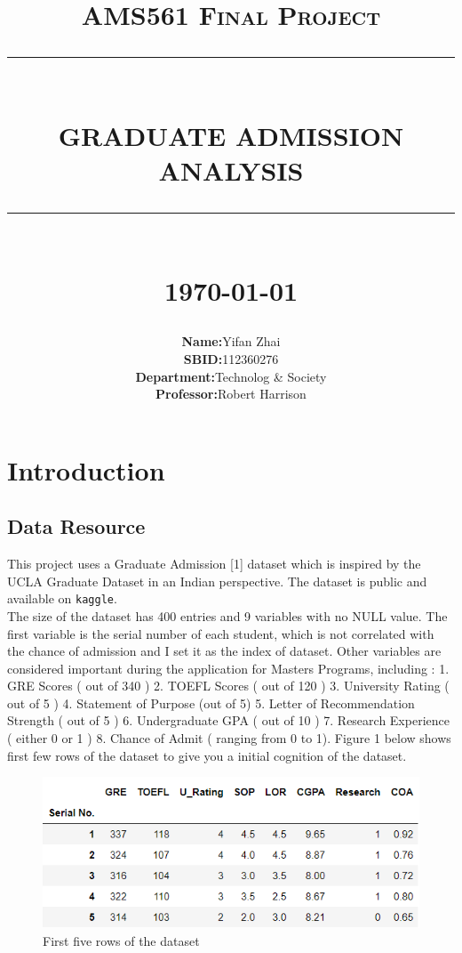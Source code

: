 \documentclass[12pt]{article}
\newcommand{\HRule}[1]{\rule{\linewidth}{#1}}
\begin{document}
\begin{sloppypar}
\title{ \LARGE \textsc{AMS561 Final Project}
		\\ [2.0cm]
		\HRule{0.5pt} \\
		\LARGE \textbf{\uppercase{Graduate Admission Analysis}}
		\HRule{2pt} \\ [0.5cm]
		\normalsize \today \vspace*{5\baselineskip}}

\date{}


\author{\begin{tabular}{rl}
  \textbf{Name:} &Yifan Zhai\\
  \textbf{SBID:}  &112360276\\
  \textbf{Department:} & Technolog \& Society\\
  \textbf{Professor:} & Robert Harrison
\end{tabular}}

\maketitle
\thispagestyle{empty}
\newpage
\setcounter{page}{1}
\tableofcontents
\newpage


\section{Introduction}

\subsection{Data Resource}
This project uses a Graduate Admission [1] dataset which is inspired by the UCLA Graduate Dataset in an Indian perspective. The dataset is public and available on \texttt{kaggle}. \\
The size of the dataset has 400 entries and 9 variables with no NULL value. The first variable is the serial number of each student, which is not correlated with the chance of admission and I set it as the index of dataset. Other variables are  considered important during the application for Masters Programs, including : 1. GRE Scores ( out of 340 ) 2. TOEFL Scores ( out of 120 ) 3. University Rating ( out of 5 ) 4. Statement of Purpose (out of 5) 5. Letter of Recommendation Strength ( out of 5 ) 6. Undergraduate GPA ( out of 10 ) 7. Research Experience ( either 0 or 1 ) 8. Chance of Admit ( ranging from 0 to 1). Figure 1 below shows first few rows of the dataset to give you a initial cognition of the dataset.
\begin{figure}[H]
    \centering
    \includegraphics{head.png}
    \caption{First five rows of the dataset}
\end{figure}



\end{sloppypar}
\end{document}
